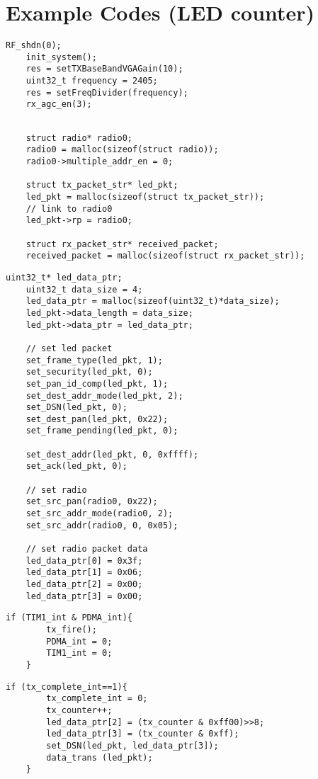 \clearpage
\section{Example Codes (LED counter)}

\lstset{basicstyle=\footnotesize\ttfamily}
\begin{lstlisting}[caption=Initialize system]
	RF_shdn(0);
	init_system();
	res = setTXBaseBandVGAGain(10);
	uint32_t frequency = 2405;
	res = setFreqDivider(frequency);
	rx_agc_en(3);
\end{lstlisting}

\begin{lstlisting}[caption=Create object]

	struct radio* radio0;
	radio0 = malloc(sizeof(struct radio));
	radio0->multiple_addr_en = 0;		

	struct tx_packet_str* led_pkt;
	led_pkt = malloc(sizeof(struct tx_packet_str));
	// link to radio0
	led_pkt->rp = radio0;				

	struct rx_packet_str* received_packet;
	received_packet = malloc(sizeof(struct rx_packet_str));
\end{lstlisting}


\begin{lstlisting}[caption=Set packet \& Radio]
	uint32_t* led_data_ptr;
	uint32_t data_size = 4;
	led_data_ptr = malloc(sizeof(uint32_t)*data_size);
	led_pkt->data_length = data_size;
	led_pkt->data_ptr = led_data_ptr;

	// set led packet
	set_frame_type(led_pkt, 1);
	set_security(led_pkt, 0);
	set_pan_id_comp(led_pkt, 1);
	set_dest_addr_mode(led_pkt, 2);
	set_DSN(led_pkt, 0);
	set_dest_pan(led_pkt, 0x22);
	set_frame_pending(led_pkt, 0);

	set_dest_addr(led_pkt, 0, 0xffff);
	set_ack(led_pkt, 0);

	// set radio
	set_src_pan(radio0, 0x22);
	set_src_addr_mode(radio0, 2);
	set_src_addr(radio0, 0, 0x05);

	// set radio packet data
	led_data_ptr[0] = 0x3f;
	led_data_ptr[1] = 0x06;
	led_data_ptr[2] = 0x00;
	led_data_ptr[3] = 0x00;
\end{lstlisting}


\begin{lstlisting}[caption=Periodic transmit]
	if (TIM1_int & PDMA_int){
		tx_fire();
		PDMA_int = 0;
		TIM1_int = 0;
	}
\end{lstlisting}


\begin{lstlisting}[caption=Load packet]
	if (tx_complete_int==1){
		tx_complete_int = 0;
		tx_counter++;
		led_data_ptr[2] = (tx_counter & 0xff00)>>8;
		led_data_ptr[3] = (tx_counter & 0xff);
		set_DSN(led_pkt, led_data_ptr[3]);
		data_trans (led_pkt);
	}
\end{lstlisting}

